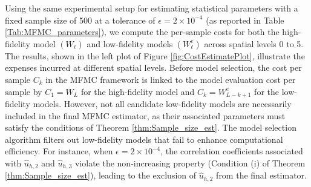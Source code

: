 Using the same experimental setup for estimating statistical parameters with a fixed sample size of 500 at a tolerance of $\epsilon=2\times 10^{-4}$ (as reported in Table \ref{Tab:MFMC_parameters}), we compute the per-sample costs for both the high-fidelity model $(W_\ell)$ and low-fidelity models $(W_\ell^e)$ across spatial levels 0 to 5. The results, shown in the left plot of Figure \ref{fig:CostEstimatePlot}, illustrate the expenses incurred at different spatial levels.  Before model selection, the cost per sample $C_k$ in the MFMC framework is linked to the model evaluation cost per sample by $C_1=W_{L}$ for the high-fidelity model and $C_k=W_{L-k+1}^e$ for the low-fidelity models. However, not all candidate low-fidelity models are necessarily included in the final MFMC estimator, as their associated parameters must satisfy the conditions of Theorem \ref{thm:Sample_size_est}. The model selection algorithm filters out low-fidelity models that fail to enhance computational efficiency. For instance, when $\epsilon=2\times 10^{-4}$, the correlation coefficients associated with $\widehat u_{h,2}$ and  $\widehat u_{h,3}$ violate the non-increasing property (Condition (i) of Theorem \ref{thm:Sample_size_est}), leading to the exclusion of $\widehat u_{h,2}$ from the final estimator. 


